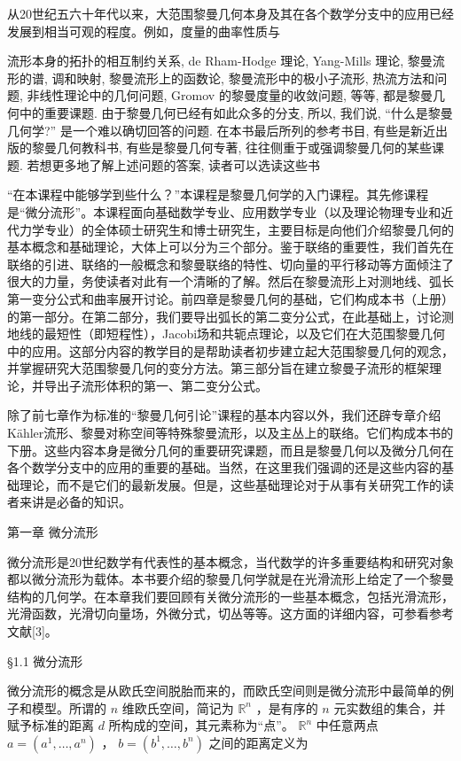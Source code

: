 从20世纪五六十年代以来，大范围黎曼几何本身及其在各个数学分支中的应用已经发展到相当可观的程度。例如，度量的曲率性质与

流形本身的拓扑的相互制约关系, de Rham-Hodge 理论, Yang-Mills 理论, 黎曼流形的谱, 调和映射, 黎曼流形上的函数论, 黎曼流形中的极小子流形, 热流方法和问题, 非线性理论中的几何问题, Gromov 的黎曼度量的收敛问题, 等等, 都是黎曼几何中的重要课题. 由于黎曼几何已经有如此众多的分支, 所以, 我们说, “什么是黎曼几何学?” 是一个难以确切回答的问题. 在本书最后所列的参考书目, 有些是新近出版的黎曼几何教科书, 有些是黎曼几何专著, 往往侧重于或强调黎曼几何的某些课题. 若想更多地了解上述问题的答案, 读者可以选读这些书

“在本课程中能够学到些什么？”本课程是黎曼几何学的入门课程。其先修课程是“微分流形”。本课程面向基础数学专业、应用数学专业（以及理论物理专业和近代力学专业）的全体硕士研究生和博士研究生，主要目标是向他们介绍黎曼几何的基本概念和基础理论，大体上可以分为三个部分。鉴于联络的重要性，我们首先在联络的引进、联络的一般概念和黎曼联络的特性、切向量的平行移动等方面倾注了很大的力量，务使读者对此有一个清晰的了解。然后在黎曼流形上对测地线、弧长第一变分公式和曲率展开讨论。前四章是黎曼几何的基础，它们构成本书（上册）的第一部分。在第二部分，我们要导出弧长的第二变分公式，在此基础上，讨论测地线的最短性（即短程性），Jacobi场和共轭点理论，以及它们在大范围黎曼几何中的应用。这部分内容的教学目的是帮助读者初步建立起大范围黎曼几何的观念，并掌握研究大范围黎曼几何的变分方法。第三部分旨在建立黎曼子流形的框架理论，并导出子流形体积的第一、第二变分公式。

除了前七章作为标准的“黎曼几何引论”课程的基本内容以外，我们还辟专章介绍Kähler流形、黎曼对称空间等特殊黎曼流形，以及主丛上的联络。它们构成本书的下册。这些内容本身是微分几何的重要研究课题，而且是黎曼几何以及微分几何在各个数学分支中的应用的重要的基础。当然，在这里我们强调的还是这些内容的基础理论，而不是它们的最新发展。但是，这些基础理论对于从事有关研究工作的读者来讲是必备的知识。

 第一章 微分流形

微分流形是20世纪数学有代表性的基本概念，当代数学的许多重要结构和研究对象都以微分流形为载体。本书要介绍的黎曼几何学就是在光滑流形上给定了一个黎曼结构的几何学。在本章我们要回顾有关微分流形的一些基本概念，包括光滑流形，光滑函数，光滑切向量场，外微分式，切丛等等。这方面的详细内容，可参看参考文献[3]。

 §1.1 微分流形

微分流形的概念是从欧氏空间脱胎而来的，而欧氏空间则是微分流形中最简单的例子和模型。所谓的  $n$  维欧氏空间，简记为  $\mathbb{R}^n$ ，是有序的  $n$  元实数组的集合，并赋予标准的距离  $d$  所构成的空间，其元素称为“点”。 $\mathbb{R}^n$  中任意两点  $a = (a^1, \dots, a^n)$ ， $b = (b^1, \dots, b^n)$  之间的距离定义为

